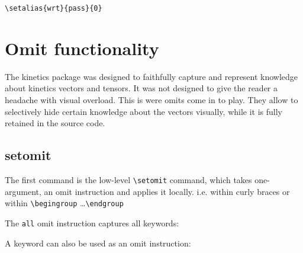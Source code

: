 \documentclass[10pt,a4paper]{article}
\begin{document}
\verb+\setalias{wrt}{pass}{0}+



\section{Omit functionality}

The kinetics package was designed to faithfully capture and represent knowledge about kinetics vectors and tensors. It was not designed to give the reader a headache with visual overload. This is were omits come in to play. They allow to selectively hide certain knowledge about the vectors visually, while it is fully retained in the source code. 


\subsection{setomit}
The first command is the low-level \verb=\setomit= command, which takes one-argument, an omit instruction and applies it locally. i.e. within curly braces or within \verb=\begingroup= \ldots \verb=\endgroup= 

The \verb=all= omit instruction captures all keywords:
\begin{SideBySideExample}[xrightmargin=1cm,frame=single]
  \AngularImpulse[object=1,wrt=0]
\end{SideBySideExample}


A keyword can also be used as an omit instruction:
\begin{SideBySideExample}[xrightmargin=1cm,frame=single]
  \AngularImpulse[object=1,wrt=0]
  \begingroup
    \AngularImpulse[object=1,wrt=0]
    \AngularImpulse[object=1,wrt=0]
  \endgroup
  \AngularImpulse[object=1,wrt=0]
\end{SideBySideExample}

\end{document}
